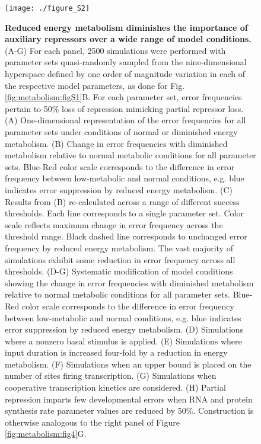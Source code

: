 \begin{figure}[h!]
\label{fig:metabolism:figS2}
\centering
\texttt{[image: ./figure\_S2]}
\caption[Reduced energy metabolism diminishes the importance of auxiliary repressors over a wide range of model conditions.]{\textbf{Reduced energy metabolism diminishes the importance of auxiliary repressors over a wide range of model conditions.} (A-G) For each panel, 2500 simulations were performed with parameter sets quasi-randomly sampled from the nine-dimensional hyperspace defined by one order of magnitude variation in each of the respective model parameters, as done for Fig. \ref{fig:metabolism:figS1}B. For each parameter set, error frequencies pertain to 50\% loss of repression mimicking partial repressor loss. (A) One-dimensional representation of the error frequencies for all parameter sets under conditions of normal or diminished energy metabolism. (B) Change in error frequencies with diminished metabolism relative to normal metabolic conditions for all parameter sets. Blue-Red color scale corresponds to the difference in error frequency between low-metabolic and normal conditions, e.g. blue indicates error suppression by reduced energy metabolism. (C) Results from (B) re-calculated across a range of different success thresholds. Each line corresponds to a single parameter set. Color scale reflects maximum change in error frequency across the threshold range. Black dashed line corresponds to unchanged error frequency by reduced energy metabolism. The vast majority of simulations exhibit some reduction in error frequency across all thresholds. (D-G) Systematic modification of model conditions showing the change in error frequencies with diminished metabolism relative to normal metabolic conditions for all parameter sets. Blue-Red color scale corresponds to the difference in error frequency between low-metabolic and normal conditions, e.g. blue indicates error suppression by reduced energy metabolism. (D) Simulations where a nonzero basal stimulus is applied. (E) Simulations where input duration is increased four-fold by a reduction in energy metabolism. (F) Simulations when an upper bound is placed on the number of sites firing transcription. (G) Simulations when cooperative transcription kinetics are considered. (H) Partial repression imparts few developmental errors when RNA and protein synthesis rate parameter values are reduced by 50\%. Construction is otherwise analogous to the right panel of Figure \ref{fig:metabolism:fig4}G.}
\end{figure}

